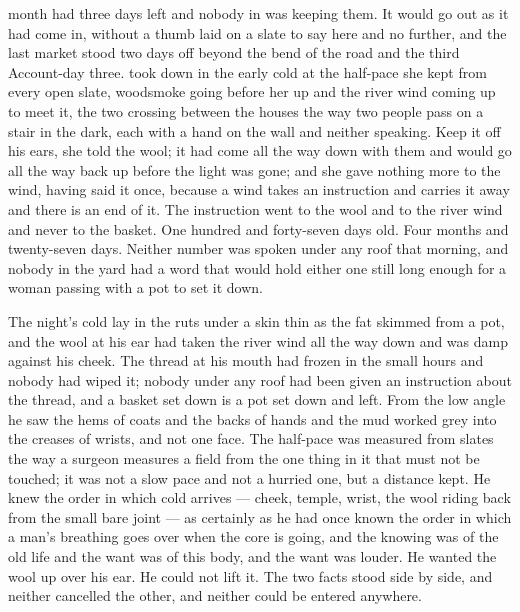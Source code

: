 
 month had three days left and nobody in  was keeping them. It would go out as it had come in, without a thumb laid on a slate to say here and no further, and the last market stood two days off beyond the bend of the road and the third Account-day three.  took  down in the early cold at the half-pace she kept from every open slate, woodsmoke going before her up  and the river wind coming up to meet it, the two crossing between the houses the way two people pass on a stair in the dark, each with a hand on the wall and neither speaking. Keep it off his ears, she told the wool; it had come all the way down with them and would go all the way back up before the light was gone; and she gave nothing more to the wind, having said it once, because a wind takes an instruction and carries it away and there is an end of it. The instruction went to the wool and to the river wind and never to the basket. One hundred and forty-seven days old. Four months and twenty-seven days. Neither number was spoken under any roof that morning, and nobody in the yard had a word that would hold either one still long enough for a woman passing with a pot to set it down.

The night's cold lay in the ruts under a skin thin as the fat skimmed from a pot, and the wool at his ear had taken the river wind all the way down and was damp against his cheek. The thread at his mouth had frozen in the small hours and nobody had wiped it; nobody under any roof had been given an instruction about the thread, and a basket set down is a pot set down and left. From the low angle he saw the hems of coats and the backs of hands and the mud worked grey into the creases of wrists, and not one face. The half-pace was measured from slates the way a surgeon measures a field from the one thing in it that must not be touched; it was not a slow pace and not a hurried one, but a distance kept. He knew the order in which cold arrives --- cheek, temple, wrist, the wool riding back from the small bare joint --- as certainly as he had once known the order in which a man's breathing goes over when the core is going, and the knowing was of the old life and the want was of this body, and the want was louder. He wanted the wool up over his ear. He could not lift it. The two facts stood side by side, and neither cancelled the other, and neither could be entered anywhere.


